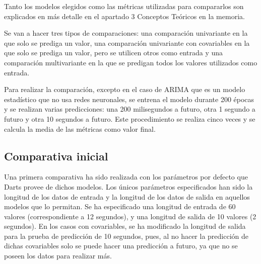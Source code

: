 Tanto los modelos elegidos como las métricas utilizadas para compararlos son explicados en más detalle en el apartado 3 Conceptos
Teóricos en la memoria.

Se van a hacer tres tipos de comparaciones: una comparación univariante en la que solo se prediga un valor, 
una comparación univariante con covariables en la que solo se prediga un valor, pero se utilicen otros como entrada y 
una comparación multivariante en la que se predigan todos los valores utilizados como entrada.


Para realizar la comparación, excepto en el caso de ARIMA que es un modelo estadístico que no usa redes neuronales, 
se entrena el modelo durante 200 épocas y se realizan varias predicciones: una 200 milisegundos a futuro, otra 
1 segundo a futuro y otra 10 segundos a futuro. Este procedimiento se realiza cinco veces y se calcula la media 
de las métricas como valor final.

\subsection*{Comparativa inicial}

Una primera comparativa ha sido realizada con los parámetros por defecto que Darts provee de dichos modelos. 
Los únicos parámetros especificados han sido la longitud de los datos de entrada y la longitud de los datos de salida 
en aquellos modelos que lo permitan. Se ha especificado una longitud de entrada de 60 valores 
(correspondiente a 12 segundos), y una longitud de salida de 10 valores (2 segundos). En los casos con covariables,
se ha modificado la longitud de salida para la prueba de predicción de 10 segundos, pues, al no hacer la predicción 
de dichas covariables solo se puede hacer una predicción a futuro, ya que no se poseen los datos para realizar más.


